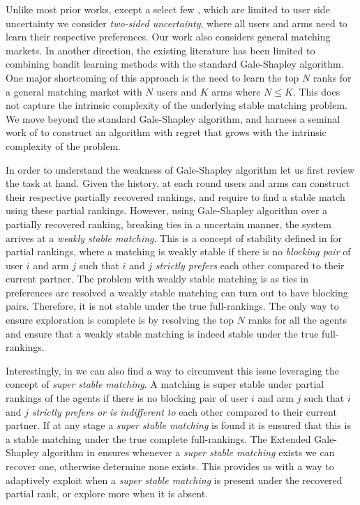 \documentclass{article}
\begin{document}
Unlike most prior works, except a select few \cite{tejas_2024,zhangdecentralized}, which are limited to user side uncertainty we consider {\em two-sided uncertainty}, where all users and arms need to learn their respective preferences. Our work also considers general matching markets. In another direction, the existing literature has been limited to combining bandit learning methods with the standard Gale-Shapley algorithm. One major shortcoming of this approach is the need to learn the top $N$ ranks for a general matching market with $N$ users and $K$ arms where $N \leq K$. This does not capture the intrinsic complexity of the underlying stable matching problem. We move beyond the standard Gale-Shapley algorithm, and harness a seminal work of \cite{irving1994stable} to construct an algorithm with regret that grows with the intrinsic complexity of the problem. 

In order to understand the weakness of Gale-Shapley algorithm let us first review the task at hand. Given the history, at each round users and arms can construct their respective partially recovered rankings, and require to find a stable match using these partial rankings. However, using Gale-Shapley algorithm over a partially recovered ranking, breaking ties in a uncertain manner, the system arrives at a {\em weakly stable matching}. This is a concept of stability defined in \cite{irving1994stable} for partial rankings, where a matching is weakly stable if there is no {\em blocking pair} of user $i$ and arm $j$ such that $i$ and $j$ {\em strictly prefers} each other compared to their current partner. The problem with weakly stable matching is as ties in preferences are resolved a weakly stable matching can turn out to have blocking pairs. Therefore, it is not stable under the true full-rankings. The only way to ensure exploration is complete is by resolving the top $N$ ranks for all the agents and ensure that a weakly stable matching is indeed stable under the true full-rankings.

Interestingly, in \cite{irving1994stable} we can also find a way to circumvent this issue leveraging the concept of {\em super stable matching}. A matching is super stable under partial rankings of the agents if there is no blocking pair of user $i$ and arm $j$ such that $i$ and $j$ {\em strictly prefers or is indifferent to} each other compared to their current partner. If at any stage a {\em super stable matching} is found it is ensured that this is a stable matching under the true complete full-rankings. The Extended Gale-Shapley algorithm in \cite{irving1994stable} ensures whenever a {\em super stable matching} exists we can recover one, otherwise determine none exists. This provides us with a way to adaptively exploit when a {\em super stable matching} is present under the recovered partial rank, or explore more when it is absent. 
\end{document}
